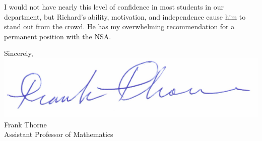 \documentclass[11pt]{article}
\begin{document}
I would not have nearly this level of confidence in most students in our department, but Richard's
ability, motivation, and independence cause him to stand out from the crowd. He has my overwhelming
recommendation for a permanent position with the NSA.

\hspace{.5\textwidth}\parbox[t]{2.95in}{
		    Sincerely,\\
		   \includegraphics{mysignature.jpg}\\ 

		    Frank Thorne\\
		    Assistant Professor of Mathematics
		   }

\vfill
\end{document}

